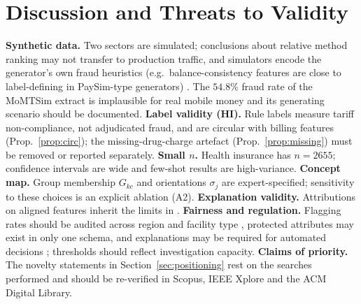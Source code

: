 \documentclass[journal]{IEEEtran}
\newcommand{\1}{\mathbf{1}}
\begin{document}
\section{Discussion and Threats to Validity}\label{sec:threats}
\textbf{Synthetic data.} Two sectors are simulated; conclusions about relative method ranking may not transfer to production traffic, and simulators encode the generator's own fraud heuristics (e.g.\ balance-consistency features are close to label-defining in PaySim-type generators) \cite{lopezrojas2016paysim,jordon2022synthetic,altman2023realistic}. The $54.8\%$ fraud rate of the MoMTSim extract is implausible for real mobile money and its generating scenario should be documented. \textbf{Label validity (HI).} Rule labels measure tariff non-compliance, not adjudicated fraud, and are circular with billing features (Prop.~\ref{prop:circ}); the missing-drug-charge artefact (Prop.~\ref{prop:missing}) must be removed or reported separately. \textbf{Small $n$.} Health insurance has $n=2655$; confidence intervals are wide and few-shot results are high-variance. \textbf{Concept map.} Group membership $G_{kc}$ and orientations $\sigma_j$ are expert-specified; sensitivity to these choices is an explicit ablation (A2). \textbf{Explanation validity.} Attributions on aligned features inherit the limits in \cite{kumar2020shapley,slack2020fooling}. \textbf{Fairness and regulation.} Flagging rates should be audited across region and facility type \cite{mehrabi2021bias}, protected attributes may exist in only one schema, and explanations may be required for automated decisions \cite{goodman2017gdpr}; thresholds should reflect investigation capacity. \textbf{Claims of priority.} The novelty statements in Section~\ref{sec:positioning} rest on the searches performed and should be re-verified in Scopus, IEEE Xplore and the ACM Digital Library.
\end{document}
